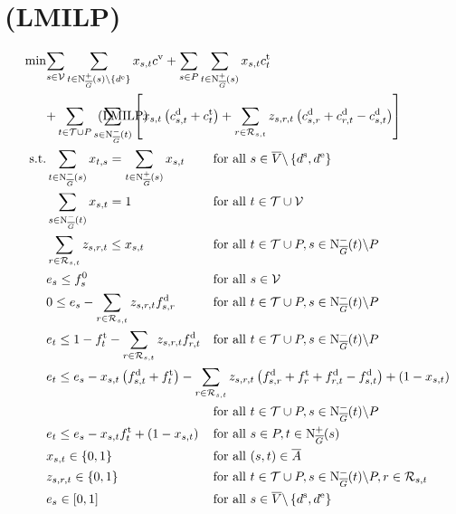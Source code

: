 \section{(LMILP)}

\begin{align}
	\min & \omit\rlap{$\displaystyle{\sum_{s\in\mathcal{V}} \sum_{t\in\Nouto(s)\backslash\{d^{\operatorname{e}}\}} x_{s,t}\cv + \sum_{s\in P}\sum_{t\in\Nouto(s)} x_{s,t} \ct_t}$} \nonumber \\
	& \omit\rlap{$\displaystyle{ + \sum_{t\in\mathcal{T}\cup P} \sum_{s\in\Nino(t)} \left[x_{s,t}\left(\cd_{s,t}+\ct_t\right) + \sum_{r\in\Rst} z_{s,r,t}\left(\cd_{s,r}+\cd_{r,t}-\cd_{s,t}\right)\right]}$} \tag{LMILP} \label{eq:Knoll:LMILP} \\
	\text{s.t.} & \sum_{t\in\Nino(s)} x_{t,s} = \sum_{t\in\Nouto(s)} x_{s,t} & & \text{for all } s\in \overline{V}\backslash\left\{d^{\operatorname{s}},d^{\operatorname{e}}\right\} \\
	& \sum_{s\in\Nino(t)} x_{s,t} = 1 & & \text{for all } t\in\mathcal{T}\cup\mathcal{V} \\
	& \sum_{r\in\Rst} z_{s,r,t} \leq x_{s,t} & & \text{for all } t\in\mathcal{T}\cup P, s\in\Nino(t)\backslash P \\
	& e_s \leq f_s^0 & & \text{for all } s\in\mathcal{V} \\
	& 0 \leq e_s - \sum_{r\in\Rst} z_{s,r,t}\fd_{s,r} & & \text{for all } t\in\mathcal{T}\cup P, s\in\Nino(t)\backslash P \\
	& e_t \leq 1 - \ft_t - \sum_{r\in\Rst} z_{s,r,t}\fd_{r,t} & & \text{for all } t\in\mathcal{T}\cup P, s\in\Nino(t)\backslash P \\
	& \omit\rlap{$\displaystyle{e_t \leq e_s - x_{s,t}\left(f_{s,t}^{\operatorname{d}}+f_t^{\operatorname{t}}\right) - \sum_{r\in\Rst} z_{s,r,t}\left(\fd_{s,r}+\ft_r+\fd_{r,t}-\fd_{s,t}\right) + \left(1-x_{s,t}\right)}$} \nonumber \\
	& & & \text{for all } t\in\mathcal{T}\cup P, s\in\Nino(t)\backslash P \\
	& e_t \leq e_s-x_{s,t}\ft_t+\left(1-x_{s,t}\right) && \text{for all } s\in P,t\in\Nouto(s) \\
	& x_{s,t}\in\{0,1\} & & \text{for all } (s,t)\in\overline{A} \\
	& z_{s,r,t}\in\{0,1\} & & \text{for all } t\in\mathcal{T}\cup P,s\in\Nino(t)\backslash P,r\in\Rst \\
	& e_s\in[0,1] & & \text{for all } s\in\overline{V}\backslash\left\{d^{\operatorname{s}},d^{\operatorname{e}}\right\}
\end{align}

